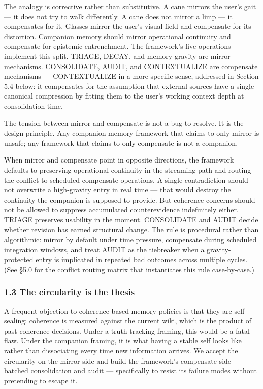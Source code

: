 \documentclass[
  11pt,
]{article}
\begin{document}
The analogy is corrective rather than substitutive. A cane mirrors the
user's gait --- it does not try to walk differently. A cane does not
mirror a limp --- it compensates for it. Glasses mirror the user's
visual field and compensate for its distortion. Companion memory should
mirror operational continuity and compensate for epistemic entrenchment.
The framework's five operations implement this split. TRIAGE, DECAY, and
memory gravity are mirror mechanisms. CONSOLIDATE, AUDIT, and
CONTEXTUALIZE are compensate mechanisms --- CONTEXTUALIZE in a more
specific sense, addressed in Section 5.4 below: it compensates for the
assumption that external sources have a single canonical compression by
fitting them to the user's working context depth at consolidation time.

The tension between mirror and compensate is not a bug to resolve. It is
the design principle. Any companion memory framework that claims to only
mirror is unsafe; any framework that claims to only compensate is not a
companion.

When mirror and compensate point in opposite directions, the framework
defaults to preserving operational continuity in the streaming path and
routing the conflict to scheduled compensate operations. A single
contradiction should not overwrite a high-gravity entry in real time ---
that would destroy the continuity the companion is supposed to provide.
But coherence concerns should not be allowed to suppress accumulated
counterevidence indefinitely either. TRIAGE preserves usability in the
moment. CONSOLIDATE and AUDIT decide whether revision has earned
structural change. The rule is procedural rather than algorithmic:
mirror by default under time pressure, compensate during scheduled
integration windows, and treat AUDIT as the tiebreaker when a
gravity-protected entry is implicated in repeated bad outcomes across
multiple cycles. (See §5.0 for the conflict routing matrix that
instantiates this rule case-by-case.)

\hypertarget{the-circularity-is-the-thesis}{%
\subsubsection{1.3 The circularity is the
thesis}\label{the-circularity-is-the-thesis}}

A frequent objection to coherence-based memory policies is that they are
self-sealing: coherence is measured against the current wiki, which is
the product of past coherence decisions. Under a truth-tracking framing,
this would be a fatal flaw. Under the companion framing, it is what
having a stable self looks like rather than dissociating every time new
information arrives. We accept the circularity on the mirror side and
build the framework's compensate side --- batched consolidation and
audit --- specifically to resist its failure modes without pretending to
escape it.
\end{document}
